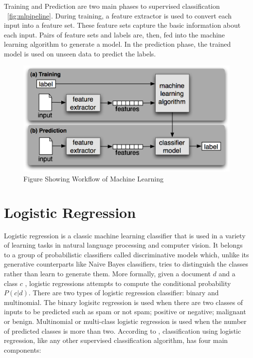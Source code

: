 Training and Prediction are two main phases to supervised classification ~\ref{fig:mlpipeline}. During training, a feature extractor is used to convert each input into a feature set. These feature sets capture the basic information about each input. Pairs of feature sets and labels are, then, fed into the machine learning algorithm to generate a model. In the prediction phase, the trained model is used on unseen data to predict the labels. 

\begin{figure}
\includegraphics[scale=.8]{../Figures/mlpipeline.png} \centering
\caption{Figure Showing Workflow of Machine Learning }
\end{figure}

 \section{Logistic Regression}
 
Logistic regression is a classic machine learning classifier that is used in a variety of learning tasks in natural language processing and computer vision. It belongs to a group of probabilistic classifiers called discriminative models which, unlike its generative counterparts like Naive Bayes classifiers, tries to distinguish the classes rather than learn to generate them. More formally, given a document $d$ and a class $c$ , logistic regressions attempts to compute the conditional probability $P(c|d)$. There are two types of logistic regression classifier: binary and multinomial. The binary logisitc regression is used when there are two classes of inputs to be predicted such as spam or not spam; positive or negative; malignant or benign. Multinomial or multi-class logistic regression is used when the number of predicted classes is more than two.
 According to \citep{jurafsky2014speech}, classification using logistic regression, like any other supervised classification algorithm, has four main components: 

